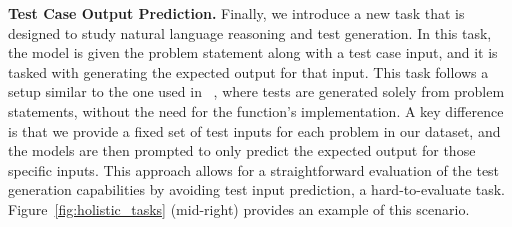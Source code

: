 \vspace{3pt}
\noindent \textbf{Test Case Output Prediction.} 
Finally, we introduce a new task that is designed to study natural language reasoning and test generation. 
In this task, the model is given the problem statement along with a test case input, and it is tasked with generating the expected output for that input. 
This task follows a setup similar to the one used in \codet{}~\citep{chen2022codet}, where tests are generated solely from problem statements, without the need for the function's implementation.
A key difference is that we provide a fixed set of test inputs for each problem in our dataset, and the models are then prompted to only predict the expected output for those specific inputs. 
This approach allows for a straightforward evaluation of the test generation capabilities by avoiding test input prediction, a hard-to-evaluate task.
Figure~\ref{fig:holistic_tasks} (mid-right) provides an example of this scenario.



